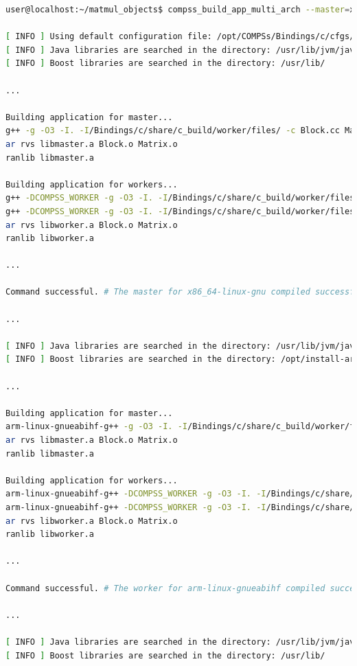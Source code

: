 \begin{lstlisting}[language=bash]
user@localhost:~/matmul_objects$ compss_build_app_multi_arch --master=x86_64-linux-gnu --worker=arm-linux-gnueabihf,x86_64-linux-gnu Matmul

[ INFO ] Using default configuration file: /opt/COMPSs/Bindings/c/cfgs/compssrc.
[ INFO ] Java libraries are searched in the directory: /usr/lib/jvm/java-1.8.0-openjdk-amd64/jre/lib/amd64/server
[ INFO ] Boost libraries are searched in the directory: /usr/lib/

...

Building application for master...
g++ -g -O3 -I. -I/Bindings/c/share/c_build/worker/files/ -c Block.cc Matrix.cc 
ar rvs libmaster.a Block.o Matrix.o
ranlib libmaster.a

Building application for workers...
g++ -DCOMPSS_WORKER -g -O3 -I. -I/Bindings/c/share/c_build/worker/files/ -c Block.cc -o Block.o
g++ -DCOMPSS_WORKER -g -O3 -I. -I/Bindings/c/share/c_build/worker/files/ -c Matrix.cc -o Matrix.o
ar rvs libworker.a Block.o Matrix.o 
ranlib libworker.a

... 

Command successful. # The master for x86_64-linux-gnu compiled successfuly

...

[ INFO ] Java libraries are searched in the directory: /usr/lib/jvm/java-1.8.0-openjdk-armhf/jre/lib/arm/server
[ INFO ] Boost libraries are searched in the directory: /opt/install-arm/libboost

...

Building application for master...
arm-linux-gnueabihf-g++ -g -O3 -I. -I/Bindings/c/share/c_build/worker/files/ -c Block.cc Matrix.cc 
ar rvs libmaster.a Block.o Matrix.o
ranlib libmaster.a

Building application for workers...
arm-linux-gnueabihf-g++ -DCOMPSS_WORKER -g -O3 -I. -I/Bindings/c/share/c_build/worker/files/ -c Block.cc -o Block.o
arm-linux-gnueabihf-g++ -DCOMPSS_WORKER -g -O3 -I. -I/Bindings/c/share/c_build/worker/files/ -c Matrix.cc -o Matrix.o
ar rvs libworker.a Block.o Matrix.o 
ranlib libworker.a

...

Command successful. # The worker for arm-linux-gnueabihf compiled successfuly

...

[ INFO ] Java libraries are searched in the directory: /usr/lib/jvm/java-1.8.0-openjdk-amd64/jre/lib/amd64/server
[ INFO ] Boost libraries are searched in the directory: /usr/lib/


\end{lstlisting}
